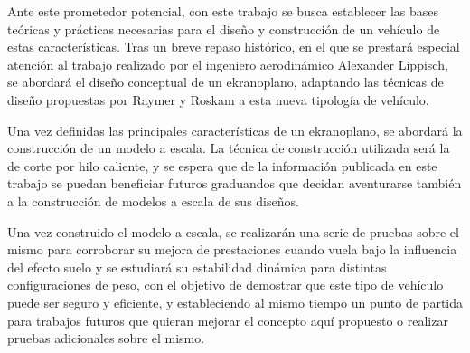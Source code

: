 
Ante este prometedor potencial, con este trabajo se busca establecer las bases teóricas y prácticas necesarias para el diseño y construcción de un vehículo de estas características.  Tras un breve repaso histórico, en el que se prestará especial atención al trabajo realizado por el ingeniero aerodinámico Alexander Lippisch, se abordará el diseño conceptual de un ekranoplano, adaptando las técnicas de diseño propuestas por Raymer\cite{ref:raymer}  y Roskam\cite{ref:roskam} a esta nueva tipología de vehículo.

Una vez definidas las principales características de un ekranoplano, se abordará la construcción de un modelo a escala. 
La técnica de construcción utilizada será la de corte por hilo caliente, y se espera que de la información publicada en este trabajo se puedan beneficiar futuros graduandos que decidan aventurarse también a la construcción de modelos a escala de sus diseños.

Una vez construido el modelo a escala, se realizarán una serie de pruebas sobre el mismo para corroborar su mejora de prestaciones cuando vuela bajo la influencia del efecto suelo y se estudiará su estabilidad dinámica para distintas configuraciones de peso, con el objetivo de demostrar que este tipo de vehículo puede ser seguro y eficiente, y estableciendo al mismo tiempo un punto de partida para trabajos futuros que quieran mejorar el concepto aquí propuesto o realizar pruebas adicionales sobre el mismo.
